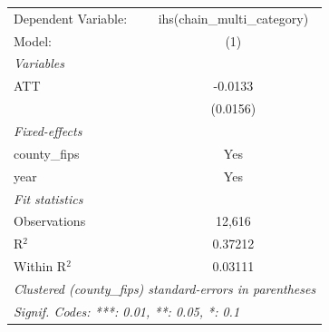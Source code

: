 
\begingroup
\centering
\begin{tabular}{lc}
   \tabularnewline \midrule \midrule
   Dependent Variable: & ihs(chain\_multi\_category)\\    
   Model:              & (1)\\  
   \midrule
   \emph{Variables}\\
   ATT                 & -0.0133\\   
                       & (0.0156)\\   
   \midrule
   \emph{Fixed-effects}\\
   county\_fips        & Yes\\  
   year                & Yes\\  
   \midrule
   \emph{Fit statistics}\\
   Observations        & 12,616\\  
   R$^2$               & 0.37212\\  
   Within R$^2$        & 0.03111\\  
   \midrule \midrule
   \multicolumn{2}{l}{\emph{Clustered (county\_fips) standard-errors in parentheses}}\\
   \multicolumn{2}{l}{\emph{Signif. Codes: ***: 0.01, **: 0.05, *: 0.1}}\\
\end{tabular}
\par\endgroup


